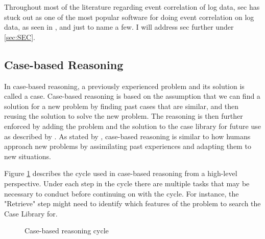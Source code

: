 Throughout most of the literature regarding event correlation of log data, \acrfull{sec} \cite{SEC} has stuck out as one of the most popular software for doing event correlation on log data, as seen in \textcite{kont2017frankenstack}, \textcite{farshchi2018anomaly} and \textcite{vaarandi2003data} just to name a few. I will address \acrshort{sec} further under \cref{sec:SEC}.

\subsection{Case-based Reasoning}

In case-based reasoning, a previously experienced problem and its solution is called a case. Case-based reasoning is based on the assumption that we can find a solution for a new problem by finding past cases that are similar, and then reusing the solution to solve the new problem. The reasoning is then further enforced by adding the problem and the solution to the case library for future use as described by \textcite{aamodt_1994}.
As stated by \textcite{slade_1991}, case-based reasoning is similar to how humans approach new problems by assimilating past experiences and adapting them to new situations.

Figure \ref{fig:case-based-reasoning-cycle} describes the cycle used in case-based reasoning from a high-level perspective.
Under each step in the cycle there are multiple tasks that may be necessary to conduct before continuing on with the cycle. For instance, the "Retrieve" step might need to identify which features of the problem to search the Case Library for.
\begin{figure}[ht]
\centering
\caption{Case-based reasoning cycle}
\label{fig:case-based-reasoning-cycle}
\end{figure}

